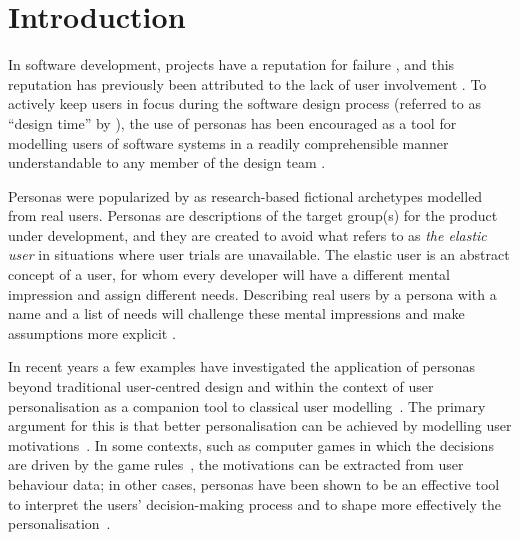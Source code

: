 \section{Introduction}

In software development, projects have a reputation for failure \citep{Savolainen2012}, and this reputation has previously been attributed to the lack of user involvement \citep{Ewusi-Mensah2003}. To actively keep users in focus during the software design process (referred to as ``design time'' by \cite{Fischer2001}), the use of personas has been encouraged as a tool for modelling users of software systems in a readily comprehensible manner understandable to any member of the design team \citep{Cooper1999,Pruitt2006,Pruitt2003}. 

Personas were popularized by \cite{Cooper1999} as research-based fictional archetypes modelled from real users. Personas are descriptions of the target group(s) for the product under development, and they are created to avoid what \cite{Cooper2007} refers to as \textit{the elastic user} in situations where user trials are unavailable. The elastic user is an abstract concept of a user, for whom every developer will have a different mental impression and assign different needs. Describing real users by a persona with a name and a list of needs will challenge these mental impressions and make assumptions more explicit \citep{Miaskiewicz2011}. 

In recent years a few examples have investigated the application of personas beyond traditional user-centred design and within the context of user personalisation as a companion tool to classical user modelling~\citep{Madureira2014,Holmgard2014}. The primary argument for this is that better personalisation can be achieved by modelling user motivations~\citep{Melhart2019}. In some contexts, such as computer games in which the decisions are driven by the game rules~\citep{Holmgard2014}, the motivations can be extracted from user behaviour data; in other cases, personas have been shown to be an effective tool to interpret the users' decision-making process and to shape more effectively the personalisation~\citep{Casas2008,Madureira2014}.


